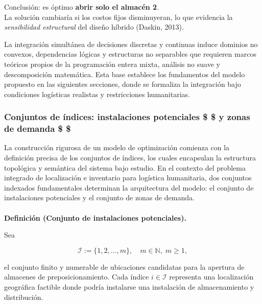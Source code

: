 \documentclass[
  spanish,
  letterpaper,
  DIV=11,
  numbers=noendperiod]{scrartcl}
\makeatletter
\let\oldparagraph\paragraph
\renewcommand{\paragraph}{
    \@ifstar
      \xxxParagraphStar
      \xxxParagraphNoStar
  }
\newcommand{\xxxParagraphStar}[1]{\oldparagraph*{#1}\mbox{}}
\newcommand{\xxxParagraphNoStar}[1]{\oldparagraph{#1}\mbox{}}
\makeatother
\begin{document}
Conclusión: es óptimo \textbf{abrir solo el almacén 2}.\\
La solución cambiaría si los costos fijos disminuyeran, lo que evidencia
la \emph{sensibilidad estructural} del diseño híbrido (Daskin, 2013).

La integración simultánea de decisiones discretas y continuas induce
dominios no convexos, dependencias lógicas y estructuras no separables
que requieren marcos teóricos propios de la programación entera mixta,
análisis no suave y descomposición matemática. Esta base establece los
fundamentos del modelo propuesto en las siguientes secciones, donde se
formaliza la integración bajo condiciones logísticas realistas y
restricciones humanitarias.

\subsubsection{\texorpdfstring{Conjuntos de índices: instalaciones
potenciales \$  \$ y zonas de demanda \$ 
\$}{Conjuntos de índices: instalaciones potenciales \$  \$ y zonas de demanda \$  \$}}\label{conjuntos-de-uxedndices-instalaciones-potenciales-y-zonas-de-demanda}

La construcción rigurosa de un modelo de optimización comienza con la
definición precisa de los conjuntos de índices, los cuales encapsulan la
estructura topológica y semántica del sistema bajo estudio. En el
contexto del problema integrado de localización e inventario para
logística humanitaria, dos conjuntos indexados fundamentales determinan
la arquitectura del modelo: el conjunto de instalaciones potenciales y
el conjunto de zonas de demanda.

\paragraph{\texorpdfstring{\textbf{Definición (Conjunto de instalaciones
potenciales).}}{Definición (Conjunto de instalaciones potenciales).}}\label{definiciuxf3n-conjunto-de-instalaciones-potenciales.}

Sea

\[
\mathcal{I} := \{1, 2, \dots, m\}, \quad m \in \mathbb{N},\; m \geq 1,
\]

el conjunto finito y numerable de ubicaciones candidatas para la
apertura de almacenes de preposicionamiento. Cada índice
\(i \in \mathcal{I}\) representa una localización geográfica factible
donde podría instalarse una instalación de almacenamiento y
distribución.
\end{document}
